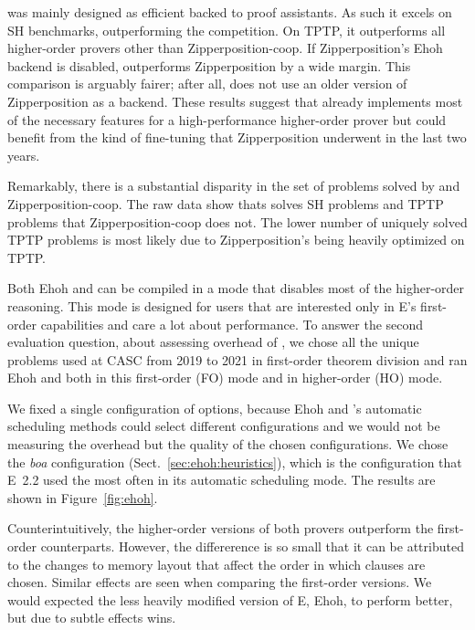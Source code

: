   \ehohii{} was mainly designed as efficient backed to proof assistants. As such it 
  excels on SH benchmarks, outperforming the competition. On TPTP, it outperforms all higher-order provers other than Zipperposition-coop.
  If Zipperposition's Ehoh backend is disabled,
  \ehohii{} outperforms Zipperposition by a wide margin.
  This comparison is arguably fairer; after all,
  \ehohii{} does not use an older version of Zipperposition
  as a backend.
  These results suggest that \ehohii{} already implements most of the necessary features
  for a high-performance higher-order prover
  but could benefit from the kind of fine-tuning that
  Zipperposition underwent in the last two years.
  
  Remarkably, there is a substantial disparity in the set of problems solved by
  \ehohii{} and Zipperposition-coop. The raw data show thats \ehohii{} solves
   SH problems and  TPTP problems that Zipperposition-coop
  does not. The lower number of uniquely solved TPTP problems is most likely 
  due to Zipperposition's being heavily optimized on TPTP.
  
   Both Ehoh and \ehohii{} can be compiled
  in a mode that disables most of the higher-order reasoning. This mode is
  designed for users that are interested only in E's first-order capabilities and
  care a lot about performance.
  To answer the second
  evaluation question, about assessing overhead of \ehohii{},
  we chose all the  unique problems used at CASC
  from 2019 to 2021 in first-order theorem division and ran Ehoh and \ehohii{}
  both in this first-order (FO) mode and in higher-order (HO) mode.
  
  We fixed a single
  configuration of options, because Ehoh and \ehohii{}'s
  automatic scheduling methods could select different configurations
  and we would not be measuring the overhead but the quality of the chosen
  configurations. We chose the \emph{boa} configuration (Sect.~\ref{sec:ehoh:heuristics}),
  which is the configuration that E~2.2 used the most often in its automatic scheduling mode.
  The results are shown in Figure~\ref{fig:ehoh}.
  
  Counterintuitively, the higher-order versions of both provers outperform
  the first-order counterparts. However, the differerence is so small that it can
  be attributed to the changes to memory layout that affect the order in which
  clauses are chosen. Similar effects are seen when comparing the first-order versions.
  We would expected the less heavily modified version of E, Ehoh, to perform better,
  but due to subtle effects \ehohii{} wins.
  
